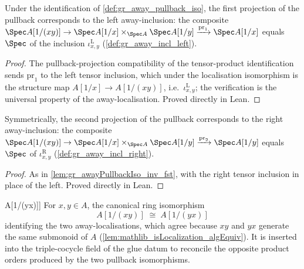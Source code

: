 \begin{lemma}

  \label{lem:gr_awayPullbackIso_inv_fst}
  Under the identification of \cref{def:gr_away_pullback_iso}, the first
  projection of the pullback corresponds to the left away-inclusion: the
  composite
  \(\Spec A[1/(xy)] \to \Spec A[1/x] \times_{\Spec A} \Spec A[1/y]
    \xrightarrow{\mathrm{pr}_1} \Spec A[1/x]\)
  equals \(\Spec\) of the inclusion \(\iota^{\mathrm{L}}_{x,y}\)
  (\cref{def:gr_away_incl_left}).
\end{lemma}
\begin{proof}
  \leanok
  The pullback-projection compatibility of the tensor-product identification
  sends \(\mathrm{pr}_1\) to the left tensor inclusion, which under the
  localisation isomorphism is the structure map \(A[1/x] \to A[1/(xy)]\), i.e.\
  \(\iota^{\mathrm{L}}_{x,y}\); the verification is the universal property of the
  away-localisation. Proved directly in Lean.
\end{proof}

\begin{lemma}

  \label{lem:gr_awayPullbackIso_inv_snd}
  Symmetrically, the second projection of the pullback corresponds to the right
  away-inclusion: the composite
  \(\Spec A[1/(xy)] \to \Spec A[1/x] \times_{\Spec A} \Spec A[1/y]
    \xrightarrow{\mathrm{pr}_2} \Spec A[1/y]\)
  equals \(\Spec\) of \(\iota^{\mathrm{R}}_{x,y}\)
  (\cref{def:gr_away_incl_right}).
\end{lemma}
\begin{proof}
  \leanok
  As in \cref{lem:gr_awayPullbackIso_inv_fst}, with the right tensor inclusion in
  place of the left. Proved directly in Lean.
\end{proof}

\begin{definition}

\leanok
[Order-swap isomorphism \(A[1/(xy)] \cong A[1/(yx)]\)]
  \label{def:gr_away_mul_comm_equiv}
  For \(x, y \in A\), the canonical ring isomorphism
  \[
    A[1/(xy)] \;\cong\; A[1/(yx)]
  \]
  identifying the two away-localisations, which agree because \(xy\) and \(yx\)
  generate the same submonoid of \(A\)
  (\cref{lem:mathlib_isLocalization_algEquiv}). It is inserted into the
  triple-cocycle field of the glue datum to reconcile the opposite product
  orders produced by the two pullback isomorphisms.
\end{definition}

